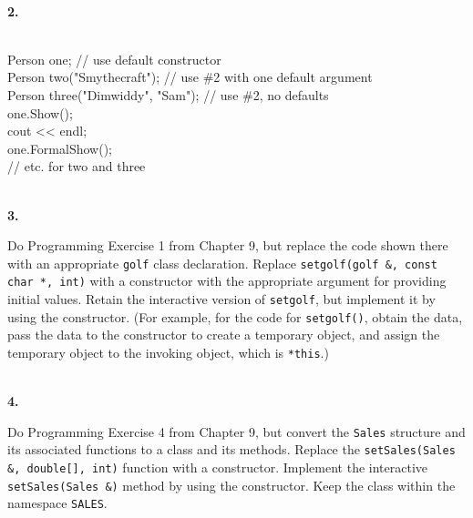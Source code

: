 \documentclass[10 pt]{amsart}
\newlength{\cwidth}
\newenvironment{cpart}[2][\cwidth]
	{\\ \phantom{\qquad}\textbf{#2. }\begin{minipage}[t]{#1}}
	{\end{minipage}}
\newcommand{\ttt}[1]{\texttt{#1}}
\begin{document}
\begin{cpart}{2}
{			\begin{tabbing}
				\hspace{6.25 cm}\= \\
				Person one; \> // use default constructor \\
				Person two("Smythecraft"); 
					\> // use \#2 with one default argument \\
				Person three("Dimwiddy", "Sam"); \> // use \#2, no defaults \\
				one.Show(); \\
				cout << endl; \\
				one.FormalShow(); \\
				// etc. for two and three
			\end{tabbing}
		}
	\end{cpart}
	\vspace{2ex}

	\begin{cpart}{3}
		Do Programming Exercise 1 from Chapter 9, but replace the 
		code shown there with an appropriate \ttt{golf} class 
		declaration.
		Replace \ttt{setgolf(golf \&, const char *, int)} with
		a constructor with the appropriate argument for providing
		initial values.
		Retain the interactive version of \ttt{setgolf}, but implement
		it by using the constructor. 
		(For example, for the code for \ttt{setgolf()}, obtain the
		data, pass the data to the constructor to create a temporary
		object, and assign the temporary object to the invoking object,
		which is \ttt{*this}.)
	\end{cpart}
	\vspace{2ex}

	\begin{cpart}{4}
		Do Programming Exercise 4 from Chapter 9, but convert the 
		\ttt{Sales} structure and its associated functions to a class
		and its methods.
		Replace the \ttt{setSales(Sales \&, double[], int)} function
		with a constructor. 
		Implement the interactive \ttt{setSales(Sales \&)} method
		by using the constructor.
		Keep the class within the namespace \ttt{SALES}.
	\end{cpart}
	\vspace{2ex}
\end{document}
